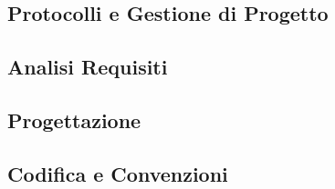 \subsection{Protocolli e Gestione di Progetto}


\subsection{Analisi Requisiti}


\subsection{Progettazione}


\subsection{Codifica e Convenzioni}
